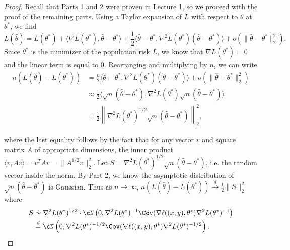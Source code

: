 \begin{proof}
Recall that Parts 1 and 2 were proven in Lecture 1, so we proceed with the proof of the remaining parts. Using a Taylor expansion of $L$ with respect to $\theta$ at $\theta^*$, we find
\begin{equation}
L(\hat \theta) = L(\theta^*) 
+ \langle \nabla L(\theta^*), \hat \theta - \theta^* \rangle 
+ \frac12 \langle \hat \theta - \theta^*, \nabla^2 L(\theta^*) (\hat \theta - \theta^*) \rangle + o(\|\hat \theta - \theta^*\|_2^2).
\end{equation}
Since $\theta^*$ is the minimizer of the population risk $L$, we know that $\nabla L(\theta^*) = 0$ and the linear term is equal to 0. Rearranging and multiplying by $n$, we can write
\begin{align}
n (L(\hat \theta) - L(\theta^*)) &= \frac{n}{2} \langle \hat \theta - \theta^*, \nabla^2 L(\theta^*) (\hat \theta - \theta^*) \rangle + o(\|\hat \theta - \theta^*\|_2^2) \\
&\approx \frac12 \langle \sqrt n(\hat \theta - \theta^*), \nabla^2 L(\theta^*) \sqrt n (\hat \theta - \theta^*) \rangle \\
&= \frac12 \left\|\nabla^2 L(\theta^*)^{1/2} \sqrt n(\hat \theta - \theta^*) \right\|_2^2,
\end{align}

where the last equality follows by the fact that for any vector $v$ and square matrix $A$ of appropriate dimensions, the inner product $\langle v, Av\rangle = v^T Av = \lVert A^{1/2}v \rVert_2^2$. Let $S = \nabla^2 L(\theta^*)^{1/2} \sqrt n(\hat \theta - \theta^*)$, i.e. the random vector inside the norm. By Part 2, we know the asymptotic distribution of $\sqrt n(\hat \theta - \theta^*)$ is Gaussian. Thus as $n \to \infty$, $n (L(\hat \theta) - L(\theta^*)) \overset d \to \frac12 \|S\|_2^2$ where
\begin{align}
    S &\sim \nabla^2 L(\theta^*)^{1/2} \cdot \cN \left(0, \nabla^2 L(\theta^*)^{-1} \Cov(\nabla \ell ((x, y), \theta^*) \nabla^2 L(\theta^*)^{-1} \right) \\
    &\stackrel{d}{=} \cN \left(0, \nabla^2 L(\theta^*)^{-1/2} \Cov(\nabla \ell ((x, y), \theta^*) \nabla^2 L(\theta^*)^{-1/2} \right).
\end{align}


\end{proof}
